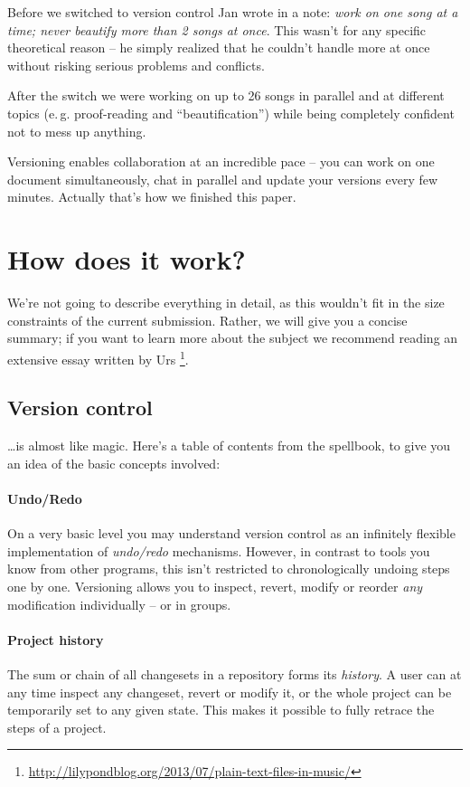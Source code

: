 \documentclass[11pt,a4paper]{article}
\begin{document}
Before we switched to version control Jan wrote in a note: \emph{work on one song
at a time; \emph{never} beautify more than 2
songs at once}. This wasn't for any specific theoretical reason -- he simply realized
that he couldn't handle more at once without risking serious problems and conflicts.

After the switch we were working on up to 26 songs in parallel and at different topics
(e.\,g. proof-reading and “beautification”) while being completely confident not to
mess up anything.

Versioning enables collaboration at an incredible pace -- you can work on one document
simultaneously, chat in parallel and update your versions every
few minutes. Actually that's how we finished this paper.


\section{How does it work?}
We're not going to describe everything in detail, as this wouldn't fit in the size
constraints of the current submission.  Rather, we will give you a concise summary;
if you want to learn more about the subject we recommend reading an extensive essay
written by Urs%
\footnote{\url{http://lilypondblog.org/2013/07/plain-text-files-in-music/}}.

\subsection{Version control}
\ldots is almost like magic.  Here's a table of contents from the spellbook,
to give you an idea of the basic concepts involved:

\paragraph{Undo/Redo}
On a very basic level you may understand version control as an infinitely flexible
implementation of \emph{undo/redo} mechanisms. However, in contrast to tools you
know from other programs, this isn't restricted to chronologically undoing steps one by
one. Versioning allows you to inspect, revert, modify or reorder \emph{any} modification
individually -- or in groups.

\paragraph{Project history}
The sum or chain of all changesets in a repository forms its \emph{history}. A user can 
at any time inspect any changeset, revert or modify it, or the whole project can be
temporarily set to any given state. This makes it possible to fully retrace the steps
of a project.
\end{document}
